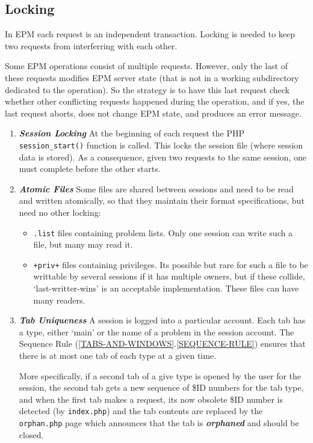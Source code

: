 \documentclass[12pt]{article}
\newcommand{\key}[1]{{\bf \em #1}}
\newcommand{\sref}[2]{(\ref{#1}.\ref{#2})}
\begin{document}
\subsection{Locking}

In EPM each request is an independent transaction.  Locking
is needed to keep two requests from interferring with each other.

Some EPM operations consist of multiple requests.  However,
only the last of these requests modifies EPM server state
(that is not in a working subdirectory dedicated to the operation).
So the strategy is to have this last request check whether
other conflicting requests happened during the operation, and
if yes, the last request aborts, does not change EPM state, and produces
an error message.

\begin{enumerate}

\item \key{Session Locking} At the beginning of each request
the PHP {\tt session\_start()} function is called.  This locks
the session file (where session data is stored).  As a consequence,
given two requests to the same session, one must complete before
the other starts.

\item \key{Atomic Files}
Some files are shared between sessions and need to be
read and written atomically, so that they maintain their
format specifications, but need no other locking:
\begin{itemize}
\item {\tt .list} files containing problem lists.  Only one
session can write such a file, but many may read it.
\item {\tt +priv+} files containing privileges.  Its possible
but rare for such a file to be writtable by several sessions if it has
multiple owners, but if these collide, `last-writter-wins' is
an acceptable implementation.  These files can have many readers.
\end{itemize}

\item \key{Tab Uniqueness}
A session is logged into a particular
account.  Each tab has a type, either `main'
or the name of a problem in the session account.
The Sequence Rule \sref{TABS-AND-WINDOWS}{SEQUENCE-RULE}
ensures that there is at most one tab of each type at a given
time.

More specifically, if a second tab of a give type is opened by
the user for the session, the second tab gets a new sequence of
\$ID numbers for the tab type, and when the first tab makes a request, its
now obsolete \$ID number is detected (by {\tt index.php}) and
the tab contents are replaced by the {\tt orphan.php} page which
announces that the tab is \key{orphaned} and should be closed.


\end{enumerate}
\end{document}
